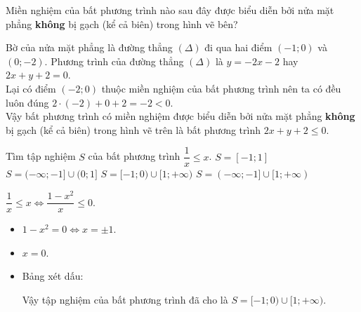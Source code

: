 \begin{ex}%
 Miền nghiệm của bất phương trình nào sau đây được biểu diễn bởi nửa mặt phẳng \textbf{không} bị gạch (kể cả biên) trong hình vẽ bên?
  {
  }
 \loigiai
 {
 Bờ của nửa mặt phẳng là đường thẳng $(\Delta)$ đi qua hai điểm $(-1;0)$ và $(0;-2)$. Phương trình của đường thẳng $(\Delta)$ là $y = -2x-2$ hay $2x + y + 2 = 0$.\\
 Lại có điểm $(-2;0)$ thuộc miền nghiệm của bất phương trình nên ta có đều luôn đúng $2 \cdot (-2) + 0 + 2 = -2 < 0$.\\
 Vậy bất phương trình có miền nghiệm được biểu diễn bởi nửa mặt phẳng \textbf{không} bị gạch (kể cả biên) trong hình vẽ trên là bất phương trình $2x + y + 2 \leq 0$.
 }
\end{ex}


\begin{ex}%
 Tìm tập nghiệm $S$ của bất phương trình $\dfrac{1}{x} \leq x$.
 \choice
  {$S = [-1;1]$}
  {$S = (-\infty;-1] \cup (0;1]$}
  {\True $S = [-1;0) \cup [1;+\infty)$}
  {$S = (-\infty;-1] \cup [1;+\infty)$}
 \loigiai
 {
 $\dfrac{1}{x} \leq x \Leftrightarrow \dfrac{1 - x^2}{x} \leq 0$.
 \begin{itemize}
  \item $1 - x^2 = 0 \Leftrightarrow x = \pm 1$.
  \item $x = 0$.
  \item Bảng xét dấu:
  \begin{center}
  \end{center}
  Vậy tập nghiệm của bất phương trình đã cho là $S = [-1;0) \cup [1;+\infty)$.
 \end{itemize}
 }
\end{ex}


